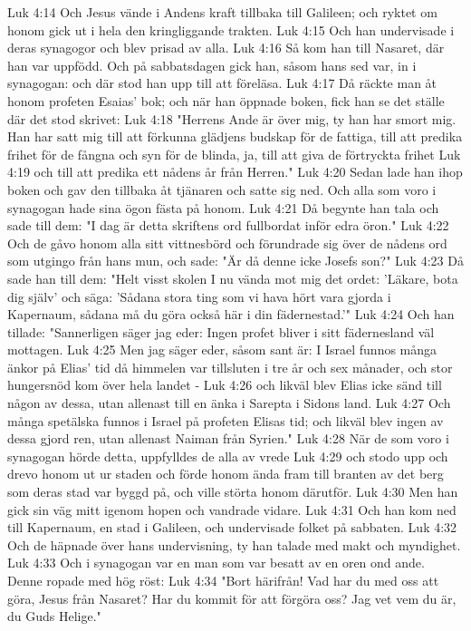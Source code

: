 Luk 4:14  Och Jesus vände i Andens kraft tillbaka till Galileen; och ryktet om honom gick ut i hela den kringliggande trakten.
Luk 4:15  Och han undervisade i deras synagogor och blev prisad av alla.
Luk 4:16  Så kom han till Nasaret, där han var uppfödd. Och på sabbatsdagen gick han, såsom hans sed var, in i synagogan: och där stod han upp till att föreläsa.
Luk 4:17  Då räckte man åt honom profeten Esaias' bok; och när han öppnade boken, fick han se det ställe där det stod skrivet:
Luk 4:18  "Herrens Ande är över mig, ty han har smort mig. Han har satt mig till att förkunna glädjens budskap för de fattiga, till att predika frihet för de fångna och syn för de blinda, ja, till att giva de förtryckta frihet
Luk 4:19  och till att predika ett nådens år från Herren."
Luk 4:20  Sedan lade han ihop boken och gav den tillbaka åt tjänaren och satte sig ned. Och alla som voro i synagogan hade sina ögon fästa på honom.
Luk 4:21  Då begynte han tala och sade till dem: "I dag är detta skriftens ord fullbordat inför edra öron."
Luk 4:22  Och de gåvo honom alla sitt vittnesbörd och förundrade sig över de nådens ord som utgingo från hans mun, och sade: "Är då denne icke Josefs son?"
Luk 4:23  Då sade han till dem: "Helt visst skolen I nu vända mot mig det ordet: 'Läkare, bota dig själv' och säga: 'Sådana stora ting som vi hava hört vara gjorda i Kapernaum, sådana må du göra också här i din fädernestad.'"
Luk 4:24  Och han tillade: "Sannerligen säger jag eder: Ingen profet bliver i sitt fädernesland väl mottagen.
Luk 4:25  Men jag säger eder, såsom sant är: I Israel funnos många änkor på Elias' tid då himmelen var tillsluten i tre år och sex månader, och stor hungersnöd kom över hela landet -
Luk 4:26  och likväl blev Elias icke sänd till någon av dessa, utan allenast till en änka i Sarepta i Sidons land.
Luk 4:27  Och många spetälska funnos i Israel på profeten Elisas tid; och likväl blev ingen av dessa gjord ren, utan allenast Naiman från Syrien."
Luk 4:28  När de som voro i synagogan hörde detta, uppfylldes de alla av vrede
Luk 4:29  och stodo upp och drevo honom ut ur staden och förde honom ända fram till branten av det berg som deras stad var byggd på, och ville störta honom därutför.
Luk 4:30  Men han gick sin väg mitt igenom hopen och vandrade vidare.
Luk 4:31  Och han kom ned till Kapernaum, en stad i Galileen, och undervisade folket på sabbaten.
Luk 4:32  Och de häpnade över hans undervisning, ty han talade med makt och myndighet.
Luk 4:33  Och i synagogan var en man som var besatt av en oren ond ande. Denne ropade med hög röst:
Luk 4:34  "Bort härifrån! Vad har du med oss att göra, Jesus från Nasaret? Har du kommit för att förgöra oss? Jag vet vem du är, du Guds Helige."
